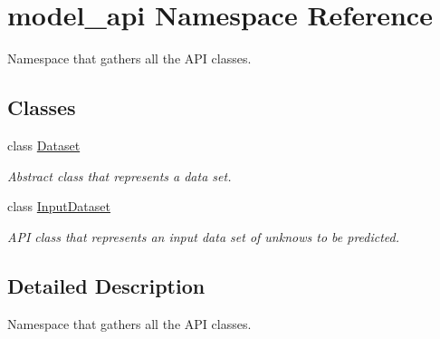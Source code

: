 \hypertarget{namespacemodel__api}{}\section{model\+\_\+api Namespace Reference}
\label{namespacemodel__api}


Namespace that gathers all the A\+PI classes.  


\subsection*{Classes}
\begin{DoxyCompactItemize}
\item 
class \hyperlink{classmodel__api_1_1Dataset}{Dataset}
\begin{DoxyCompactList}\small\item\em Abstract class that represents a data set. \end{DoxyCompactList}\item 
class \hyperlink{classmodel__api_1_1InputDataset}{Input\+Dataset}
\begin{DoxyCompactList}\small\item\em A\+PI class that represents an input data set of unknows to be predicted. \end{DoxyCompactList}\end{DoxyCompactItemize}


\subsection{Detailed Description}
Namespace that gathers all the A\+PI classes. 